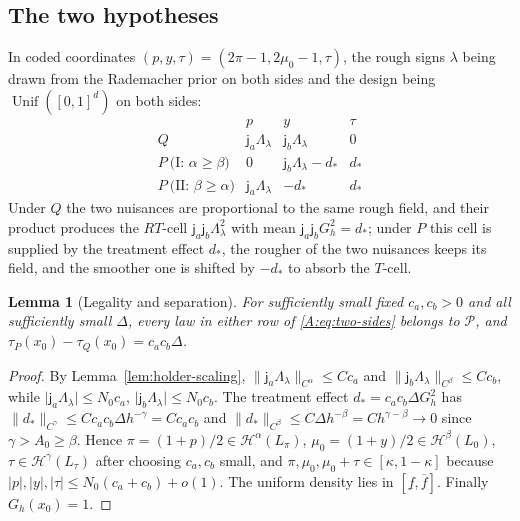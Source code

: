 \documentclass[11pt]{article}
\newtheorem{lemma}[lemma]{Lemma}
\newcommand{\cH}{\mathcal{H}}
\newcommand{\cP}{\mathcal{P}}
\newcommand{\norm}[1]{\lVert #1\rVert}
\newcommand{\abs}[1]{\lvert #1\rvert}
\newcommand{\ja}{\mathsf{j}_a}
\newcommand{\jb}{\mathsf{j}_b}
\begin{document}
\subsection{The two hypotheses}
In coded coordinates \((p,y,\tau)=(2\pi-1,2\mu_0-1,\tau)\), the rough
signs \(\lambda\) being drawn from the Rademacher prior on both sides and
the design being \(\operatorname{Unif}([0,1]^d)\) on both sides:
\begin{equation}
\begin{array}{c|ccc}
 &p&y&\tau\\ \hline
 Q&\ja\Lambda_\lambda&\jb\Lambda_\lambda&0\\
 P\ \text{(I: }\alpha\ge\beta)&0&\jb\Lambda_\lambda-d_*&d_*\\
 P\ \text{(II: }\beta\ge\alpha)&\ja\Lambda_\lambda&-d_*&d_*
\end{array}
\label{A:eq:two-sides}
\end{equation}
Under \(Q\) the two nuisances are proportional to the same rough field,
and their product produces the \(RT\)-cell \(\ja\jb\Lambda_\lambda^2\) with mean
\(\ja\jb G_h^2=d_*\); under \(P\) this cell is supplied by the treatment
effect \(d_*\), the rougher of the two nuisances keeps its field, and the
smoother one is shifted by \(-d_*\) to absorb the \(T\)-cell.

\begin{lemma}[Legality and separation]\label{A:lem:legal}
For sufficiently small fixed \(c_a,c_b>0\) and all sufficiently small
\(\Delta\), every law in either row of \eqref{A:eq:two-sides} belongs to
\(\cP\), and \(\tau_P(x_0)-\tau_Q(x_0)=c_ac_b\Delta\).
\end{lemma}
\begin{proof}
By Lemma~\ref{lem:holder-scaling}, \(\norm{\ja\Lambda_\lambda}_{C^\alpha}\le Cc_a\)
and \(\norm{\jb\Lambda_\lambda}_{C^\beta}\le Cc_b\), while
\(\abs{\ja\Lambda_\lambda}\le N_0c_a\), \(\abs{\jb\Lambda_\lambda}\le N_0c_b\).
The treatment effect \(d_*=c_ac_b\Delta G_h^2\) has
\(\norm{d_*}_{C^\gamma}\le Cc_ac_b\Delta h^{-\gamma}=Cc_ac_b\) and
\(\norm{d_*}_{C^\beta}\le C\Delta h^{-\beta}=Ch^{\gamma-\beta}\to0\) since
\(\gamma>A_0\ge\beta\).  Hence \(\pi=(1+p)/2\in\cH^\alpha(L_\pi)\),
\(\mu_0=(1+y)/2\in\cH^\beta(L_0)\), \(\tau\in\cH^\gamma(L_\tau)\) after
choosing \(c_a,c_b\) small, and \(\pi,\mu_0,\mu_0+\tau\in[\kappa,1-\kappa]\)
because \(\abs p,\abs y,\abs\tau\le N_0(c_a+c_b)+o(1)\).  The uniform
density lies in \([\underline f,\overline f]\).  Finally \(G_h(x_0)=1\).
\end{proof}
\end{document}
